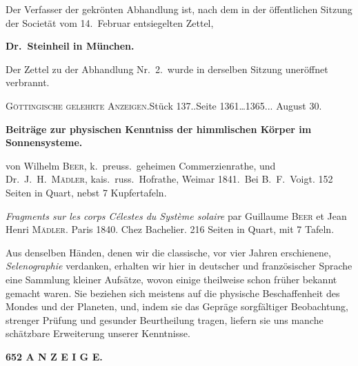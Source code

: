 \documentclass[12pt,a4paper]{article}
\newcommand{\anzeigeheading}[4]{%
    \begin{center}
    \small\textsc{G\"ottingische gelehrte Anzeigen.}\quad St\"uck #1.\quad Seite #2.\quad #3
    \end{center}
    \vspace{-2mm}
    \begin{center}\small\textbf{#4}\end{center}
    \vspace{2mm}
}
\begin{document}
Der Verfasser der gekr\"onten Abhandlung ist, nach dem in der \"offentlichen Sitzung der Societ\"at vom 14.\ Februar entsiegelten Zettel,

\begin{center}
\textbf{Dr.\ Steinheil in M\"unchen.}
\end{center}

Der Zettel zu der Abhandlung Nr.\ 2.\ wurde in derselben Sitzung uner\"offnet verbrannt.

\anzeigeheading{137.}{1361\dots 1365.}{1841. August 30.}{Beitr\"age zur physischen Kenntniss der himmlischen K\"orper im Sonnensysteme.}

\noindent\small von Wilhelm \textsc{Beer}, k.\ preuss.\ geheimen Commerzienrathe, und Dr.\ J.\ H.\ \textsc{M\"adler}, kais.\ russ.\ Hofrathe, Weimar 1841.\ Bei B.\ F.\ Voigt. 152 Seiten in Quart, nebst 7 Kupfertafeln.

\vspace{2mm}

\begin{otherlanguage}{french}
\noindent\small\textit{Fragments sur les corps C\'elestes du Syst\`eme solaire} par Guillaume \textsc{Beer} et Jean Henri \textsc{M\"adler}. Paris 1840. Chez Bachelier. 216 Seiten in Quart, mit 7 Tafeln.
\end{otherlanguage}

\vspace{2mm}

Aus denselben H\"anden, denen wir die classische, vor vier Jahren erschienene, \textit{Selenographie} verdanken, erhalten wir hier in deutscher und franz\"osischer Sprache eine Sammlung kleiner Aufs\"atze, wovon einige theilweise schon fr\"uher bekannt gemacht waren. Sie beziehen sich meistens auf die physische Beschaffenheit des Mondes und der Planeten, und, indem sie das Gepr\"age sorgf\"altiger Beobachtung, strenger Pr\"ufung und gesunder Beurtheilung tragen, liefern sie uns manche sch\"atzbare Erweiterung unserer Kenntnisse.

\newpage

\begin{center}\small\textbf{652 A N Z E I G E.}\end{center}
\end{document}
